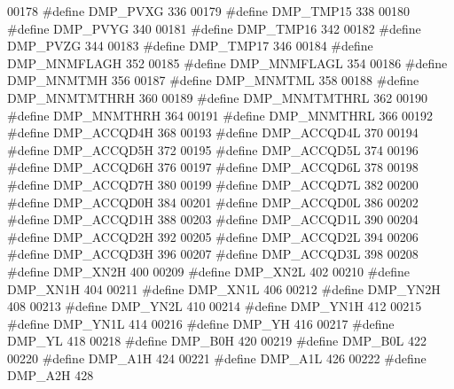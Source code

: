 \begin{DoxyCode}
00178 \textcolor{preprocessor}{#define DMP\_PVXG    336}
00179 \textcolor{preprocessor}{#define DMP\_TMP15    338}
00180 \textcolor{preprocessor}{#define DMP\_PVYG    340}
00181 \textcolor{preprocessor}{#define DMP\_TMP16    342}
00182 \textcolor{preprocessor}{#define DMP\_PVZG    344}
00183 \textcolor{preprocessor}{#define DMP\_TMP17    346}
00184 \textcolor{preprocessor}{#define DMP\_MNMFLAGH    352}
00185 \textcolor{preprocessor}{#define DMP\_MNMFLAGL    354}
00186 \textcolor{preprocessor}{#define DMP\_MNMTMH    356}
00187 \textcolor{preprocessor}{#define DMP\_MNMTML    358}
00188 \textcolor{preprocessor}{#define DMP\_MNMTMTHRH    360}
00189 \textcolor{preprocessor}{#define DMP\_MNMTMTHRL    362}
00190 \textcolor{preprocessor}{#define DMP\_MNMTHRH    364}
00191 \textcolor{preprocessor}{#define DMP\_MNMTHRL    366}
00192 \textcolor{preprocessor}{#define DMP\_ACCQD4H    368}
00193 \textcolor{preprocessor}{#define DMP\_ACCQD4L    370}
00194 \textcolor{preprocessor}{#define DMP\_ACCQD5H    372}
00195 \textcolor{preprocessor}{#define DMP\_ACCQD5L    374}
00196 \textcolor{preprocessor}{#define DMP\_ACCQD6H    376}
00197 \textcolor{preprocessor}{#define DMP\_ACCQD6L    378}
00198 \textcolor{preprocessor}{#define DMP\_ACCQD7H    380}
00199 \textcolor{preprocessor}{#define DMP\_ACCQD7L    382}
00200 \textcolor{preprocessor}{#define DMP\_ACCQD0H    384}
00201 \textcolor{preprocessor}{#define DMP\_ACCQD0L    386}
00202 \textcolor{preprocessor}{#define DMP\_ACCQD1H    388}
00203 \textcolor{preprocessor}{#define DMP\_ACCQD1L    390}
00204 \textcolor{preprocessor}{#define DMP\_ACCQD2H    392}
00205 \textcolor{preprocessor}{#define DMP\_ACCQD2L    394}
00206 \textcolor{preprocessor}{#define DMP\_ACCQD3H    396}
00207 \textcolor{preprocessor}{#define DMP\_ACCQD3L    398}
00208 \textcolor{preprocessor}{#define DMP\_XN2H    400}
00209 \textcolor{preprocessor}{#define DMP\_XN2L    402}
00210 \textcolor{preprocessor}{#define DMP\_XN1H    404}
00211 \textcolor{preprocessor}{#define DMP\_XN1L    406}
00212 \textcolor{preprocessor}{#define DMP\_YN2H    408}
00213 \textcolor{preprocessor}{#define DMP\_YN2L    410}
00214 \textcolor{preprocessor}{#define DMP\_YN1H    412}
00215 \textcolor{preprocessor}{#define DMP\_YN1L    414}
00216 \textcolor{preprocessor}{#define DMP\_YH    416}
00217 \textcolor{preprocessor}{#define DMP\_YL    418}
00218 \textcolor{preprocessor}{#define DMP\_B0H    420}
00219 \textcolor{preprocessor}{#define DMP\_B0L    422}
00220 \textcolor{preprocessor}{#define DMP\_A1H    424}
00221 \textcolor{preprocessor}{#define DMP\_A1L    426}
00222 \textcolor{preprocessor}{#define DMP\_A2H    428}

\end{DoxyCode}
